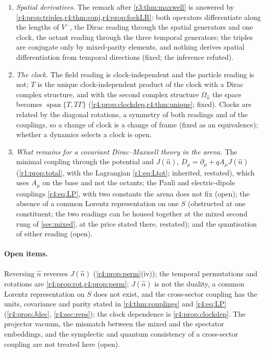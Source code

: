 \begin{enumerate}[label=(\arabic*),leftmargin=2.2em]
longitudinal octants to the Gauss-law poles; this field rotation $L(\hat n)$ is the Dirac rotation about the spatial axis $\sum_in_is_i$ combined with
half a turn of the charge (\cref{r4:prop:Jdec}; fixed; the reading interpretive).
\item \emph{Spatial derivatives.} The remark after \cref{r3:thm:maxwell} is answered by \cref{r4:prop:triples,r4:thm:conj,r4:prop:fockLR}: both operators
differentiate along the lengths of $V^-$, the Dirac reading through the spatial generators and one clock, the octant reading through the three temporal
generators; the triples are conjugate only by mixed-parity elements, and nothing derives spatial differentiation from temporal directions (fixed; the
inference refuted).
\item \emph{The clock.} The field reading is clock-independent and the particle reading is not; $T$ is the unique clock-independent product of the
clock with a Dirac complex structure, and with the second complex structure $\Omega_{\hat n}$ the space becomes $\operatorname{span}\{T,T\Gamma\}$ (\cref{r4:prop:clockdep,r4:thm:unique};
fixed). Clocks are related by the diagonal rotations, a symmetry of both readings and of the couplings, so a change of clock is a change of frame
(fixed as an equivalence); whether a dynamics selects a clock is open.
\item \emph{What remains for a covariant Dirac--Maxwell theory in the arena.} The minimal coupling through the potential and $J(\hat n)$, $D_\mu=\partial_\mu+qA_\mu J(\hat n)$
(\cref{r1:prop:total}, with the Lagrangian \cref{r1:eq:Ltot}; inherited, restated), which uses $A_\mu$ on the base and not the octants; the Pauli and electric-dipole couplings
\cref{r4:eq:LP}, with two constants the arena does not fix (open); the absence of a common Lorentz representation on one $S$ (obstructed at one constituent;
the two readings can be housed together at the mixed second rung of \cref{sec:mixed}, at the price stated there, restated); and the
quantisation of either reading (open).
\end{enumerate}

\paragraph{Open items.} Reversing $\hat n$ reverses $J(\hat n)$ (\cref{r4:prop:perm}(iv)); the temporal permutations and rotations are
\cref{r4:prop:rot,r4:prop:perm}; $J(\hat n)$ is not the duality, a common Lorentz representation on $S$ does not exist, and the cross-sector
coupling has the units, covariance and parity stated in \cref{r4:thm:couplings} and \cref{r4:eq:LP} (\cref{r4:prop:Jdec}, \cref{r4:sec:reps});
the clock dependence is \cref{r4:prop:clockdep}. The projector vacuum, the mismatch between the mixed and the spectator embeddings, and the
symplectic and quantum consistency of a cross-sector coupling are not treated here (open).

